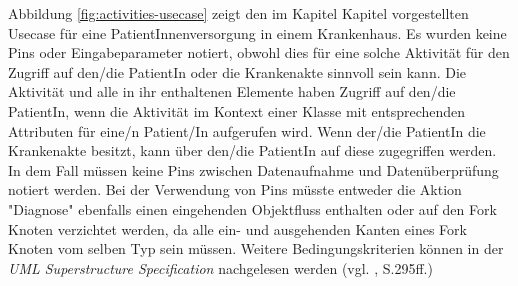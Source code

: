 Abbildung \ref{fig:activities-usecase} zeigt den im Kapitel Kapitel  vorgestellten Usecase für eine PatientInnenversorgung in einem Krankenhaus. Es wurden keine Pins oder Eingabeparameter notiert, obwohl dies für eine solche Aktivität für den Zugriff auf den/die PatientIn oder die Krankenakte sinnvoll sein kann. Die Aktivität und alle in ihr enthaltenen Elemente haben Zugriff auf den/die PatientIn, wenn die Aktivität im Kontext einer Klasse mit entsprechenden Attributen für eine/n Patient/In aufgerufen wird. Wenn der/die PatientIn die Krankenakte besitzt, kann über den/die PatientIn auf diese zugegriffen werden. In dem Fall müssen keine Pins zwischen Datenaufnahme und Datenüberprüfung notiert werden. Bei der Verwendung von Pins müsste entweder die Aktion "Diagnose" ebenfalls einen eingehenden Objektfluss enthalten oder auf den Fork Knoten verzichtet werden, da alle ein- und ausgehenden Kanten eines Fork Knoten vom selben Typ sein müssen. Weitere Bedingungskriterien können in der \emph{UML Superstructure Specification} nachgelesen werden (vgl. \citep{OMG2009}, S.295ff.)








